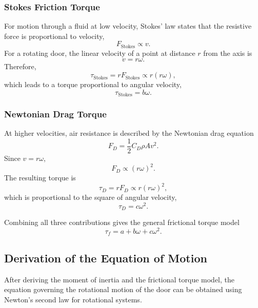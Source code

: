 \documentclass[11pt,letterpaper]{article}
\begin{document}
\subsubsection{Stokes Friction Torque}
For motion through a fluid at low velocity, Stokes' law states that the resistive force is proportional to velocity,
\begin{equation}
F_{\mathrm{Stokes}}\propto v.
\end{equation}
For a rotating door, the linear velocity of a point at distance $r$ from the axis is
\begin{equation}
v=r\omega.
\end{equation}
Therefore,
\begin{equation}
\tau_{\mathrm{Stokes}}=rF_{\mathrm{Stokes}}
\propto r(r\omega),
\end{equation}
which leads to a torque proportional to angular velocity,
\begin{equation}
\tau_{\mathrm{Stokes}}=b\omega.
\end{equation}
\subsubsection{Newtonian Drag Torque}
At higher velocities, air resistance is described by the Newtonian drag equation
\begin{equation}
F_D=\frac12 C_D\rho A v^2.
\end{equation}
Since $v=r\omega$,
\begin{equation}
F_D\propto (r\omega)^2.
\end{equation}
The resulting torque is
\begin{equation}
\tau_D=rF_D
\propto r(r\omega)^2,
\end{equation}
which is proportional to the square of angular velocity,
\begin{equation}
\tau_D=c\omega^2.
\end{equation}

Combining all three contributions gives the general frictional torque model
\begin{equation}
\tau_f=a+b\omega+c\omega^2.
\end{equation}



\subsection{Derivation of the Equation of Motion}

After deriving the moment of inertia and the frictional torque model, the equation governing the rotational motion of the door can be obtained using Newton's second law for rotational systems.
\end{document}
